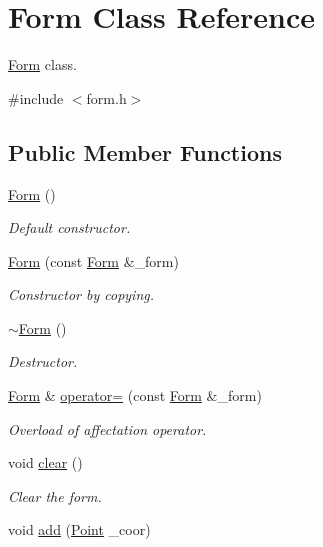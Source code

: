 \hypertarget{class_form}{}\section{Form Class Reference}
\label{class_form}


\hyperlink{class_form}{Form} class.  




{\ttfamily \#include $<$form.\+h$>$}

\subsection*{Public Member Functions}
\begin{DoxyCompactItemize}
\item 
\hyperlink{class_form_a74d41f789dbfcfd081b241e2c44e576a}{Form} ()
\begin{DoxyCompactList}\small\item\em Default constructor. \end{DoxyCompactList}\item 
\hyperlink{class_form_a56a2abc465c4fea2f76d760209d845f1}{Form} (const \hyperlink{class_form}{Form} \&\+\_\+form)
\begin{DoxyCompactList}\small\item\em Constructor by copying. \end{DoxyCompactList}\item 
\hyperlink{class_form_a9cda7cce41e81bfaca51e922d4f9b98f}{$\sim$\+Form} ()
\begin{DoxyCompactList}\small\item\em Destructor. \end{DoxyCompactList}\item 
\hyperlink{class_form}{Form} \& \hyperlink{class_form_a64ed9c18068eeaac328572a4f42f0a1f}{operator=} (const \hyperlink{class_form}{Form} \&\+\_\+form)
\begin{DoxyCompactList}\small\item\em Overload of affectation operator. \end{DoxyCompactList}\item 
void \hyperlink{class_form_a567c4924cf20b2e856f60851c821f4fe}{clear} ()
\begin{DoxyCompactList}\small\item\em Clear the form. \end{DoxyCompactList}\item 
void \hyperlink{class_form_a7499275adb667ad101834ff20e286b10}{add} (\hyperlink{struct_point}{Point} \+\_\+coor)

\end{DoxyCompactItemize}
